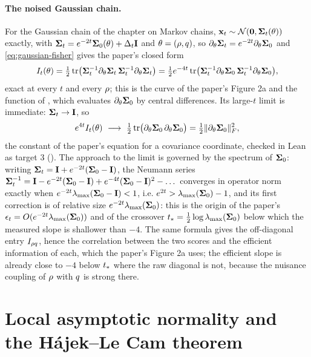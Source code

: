 \paragraph{The noised Gaussian chain.}
For the Gaussian chain of the chapter on Markov chains, $\mathbf{x}_t\sim\mathcal{N}\!\left(\mathbf{0},\mathbf{\Sigma}_t(\theta)\right)$
exactly, with $\mathbf{\Sigma}_t=e^{-2t}\mathbf{\Sigma}_0(\theta)+\Delta_t\mathbf{I}$ and $\theta=(\rho,q)$, so
$\partial_\theta\mathbf{\Sigma}_t=e^{-2t}\partial_\theta\mathbf{\Sigma}_0$ and \cref{eq:gaussian-fisher} gives the
paper's closed form
\begin{equation}
  I_t(\theta)=\tfrac12\operatorname{tr}\bigl(\mathbf{\Sigma}_t^{-1}\partial_\theta\mathbf{\Sigma}_t\,\mathbf{\Sigma}_t^{-1}\partial_\theta\mathbf{\Sigma}_t\bigr)
  =\tfrac12e^{-4t}\operatorname{tr}\bigl(\mathbf{\Sigma}_t^{-1}\partial_\theta\mathbf{\Sigma}_0\,\mathbf{\Sigma}_t^{-1}\partial_\theta\mathbf{\Sigma}_0\bigr),
  \label{eq:gaussian-chain-fisher}
\end{equation}
exact at every $t$ and every $\rho$; this is the curve of the paper's Figure 2a and
the function  of ,
which evaluates $\partial_\theta\mathbf{\Sigma}_0$ by central differences. Its large-$t$ limit is
immediate: $\mathbf{\Sigma}_t\to\mathbf{I}$, so
\begin{equation}
  e^{4t}I_t(\theta)\ \longrightarrow\ \tfrac12\tr\bigl(\partial_\theta\Sig_0\,\partial_\theta\Sig_0\bigr)=\tfrac12\Frob{\partial_\theta\Sig_0}^2,
\end{equation}
the constant of the paper's equation for a covariance coordinate, checked in Lean as
target 3 (). The approach to the limit is governed by the
spectrum of $\mathbf{\Sigma}_0$: writing $\mathbf{\Sigma}_t=\mathbf{I}+e^{-2t}(\mathbf{\Sigma}_0-\mathbf{I})$, the Neumann series
$\mathbf{\Sigma}_t^{-1}=\mathbf{I}-e^{-2t}(\mathbf{\Sigma}_0-\mathbf{I})+e^{-4t}(\mathbf{\Sigma}_0-\mathbf{I})^2-\dots$ converges in operator norm
exactly when $e^{-2t}\lambda_{\max}(\mathbf{\Sigma}_0-\mathbf{I})<1$, i.e. $e^{2t}>\lambda_{\max}(\mathbf{\Sigma}_0)-1$, and its first
correction is of relative size $e^{-2t}\lambda_{\max}(\mathbf{\Sigma}_0)$: this is the origin of the paper's
$\epsilon_t=O(e^{-2t}\lambda_{\max}(\mathbf{\Sigma}_0))$ and of the crossover $t_{*}=\tfrac12\log\lambda_{\max}(\mathbf{\Sigma}_0)$
below which the measured slope is shallower than $-4$. The same formula gives the
off-diagonal entry $I_{\rho q}$, hence the correlation between the two scores and
the efficient information of each, which the paper's Figure 2a uses; the efficient
slope is already close to $-4$ below $t_{*}$ where the raw diagonal is not, because
the nuisance coupling of $\rho$ with $q$ is strong there.

\section{Local asymptotic normality and the H\'ajek--Le Cam theorem}
\label{sec:lan}

